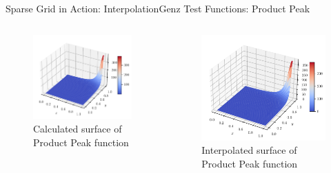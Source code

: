 \begin{frame}{Sparse Grid in Action: Interpolation}{Genz Test Functions: Product Peak}
    \begin{columns}
        \begin{column}{0.5\textwidth}
            \begin{figure}
                \centering
                \includegraphics[width=.8\textwidth]{figures/peak_surface.pdf}
                \caption{Calculated surface of Product Peak function}
            \end{figure}
        \end{column}
        \begin{column}{0.5\textwidth}
            \begin{figure}
                \centering
                \includegraphics[width=.8\textwidth]{figures/SurfacePlot_peak.pdf}
                \caption{Interpolated surface of Product Peak function}
            \end{figure}
        \end{column}
    \end{columns}
\end{frame}

